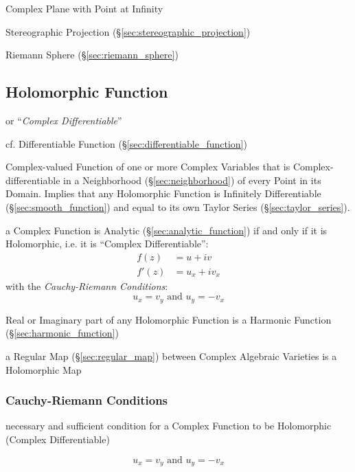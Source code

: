 Complex Plane with Point at Infinity

Stereographic Projection (\S\ref{sec:stereographic_projection})

Riemann Sphere (\S\ref{sec:riemann_sphere})



\subsection{Holomorphic Function}\label{sec:holomorphic_function}

or ``\emph{Complex Differentiable}''

cf. Differentiable Function (\S\ref{sec:differentiable_function})

Complex-valued Function of one or more Complex Variables that is
Complex-differentiable in a Neighborhood (\S\ref{sec:neighborhood}) of
every Point in its Domain. Implies that any Holomorphic Function is
Infinitely Differentiable (\S\ref{sec:smooth_function}) and equal to
its own Taylor Series (\S\ref{sec:taylor_series}).

a Complex Function is Analytic (\S\ref{sec:analytic_function}) if and only if
it is Holomorphic, i.e. it is ``Complex Differentiable'':
\begin{align*}
  f(z)  & = u + iv \\
  f'(z) & = u_x + iv_x
\end{align*}
with the \emph{Cauchy-Riemann Conditions}:
\[
  u_x = v_y \text{ and } u_y = - v_x
\]

Real or Imaginary part of any Holomorphic Function is a Harmonic
Function (\S\ref{sec:harmonic_function})

a Regular Map (\S\ref{sec:regular_map}) between Complex Algebraic Varieties is
a Holomorphic Map



\subsubsection{Cauchy-Riemann Conditions}\label{sec:cauchy_riemann}

necessary and sufficient condition for a Complex Function to be Holomorphic
(Complex Differentiable)

\[
  u_x = v_y \text{ and } u_y = - v_x
\]



